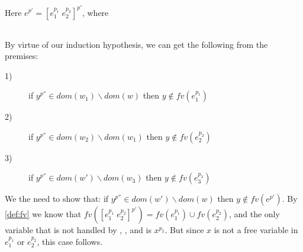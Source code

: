 \item[\runa{App-rec}] Here $e^{p'}=[e_1^{p_1}\;e_2^{p_2}]^{p'}$, where
\begin{figure}[H]
	\setlength\tabcolsep{8pt}
	\begin{tabular}{l}
		
	\end{tabular}
\end{figure}
By virtue of our induction hypothesis, we can get the following from the premises:
\begin{description}
	\item[1)] if $y^{p''}\in dom(w_1)\backslash dom(w)$ then $y\notin fv(e_1^{p_1})$
	\item[2)] if $y^{p''}\in dom(w_2)\backslash dom(w_1)$ then $y\notin fv(e_2^{p_2})$
	\item[3)] if $y^{p''}\in dom(w')\backslash dom(w_3)$ then $y\notin fv(e_3^{p_3})$
\end{description}
We the need to show that: if $y^{p''}\in dom(w')\backslash dom(w)$ then $y\notin fv(e^{p'})$.
By \cref{def:fv} we know that $fv([e_1^{p_1}\;e_2^{p_2}]^{p'})=fv(e_1^{p_1})\cup fv(e_2^{p_2})$, and the only variable that is not handled by , , and  is $x^{p_2}$.
But since $x$ is not a free variable in $e_1^{p_1}$ or $e_2^{p_2}$, this case follows.
